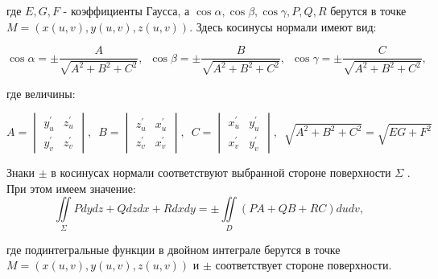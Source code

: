 где $E,G,F$ - коэффициенты Гаусса, а $\cos\alpha, \cos\beta, \cos\gamma , P,Q,R$ берутся в точке $M = (x(u, v), y(u, v), z(u, v))$. Здесь косинусы нормали имеют вид:

$$ \cos\alpha = \pm \frac{A}{\sqrt{A^2+B^2+C^2}}, \,\,\, \cos\beta = \pm \frac{B}{\sqrt{A^2+B^2+C^2}}, \,\,\, \cos\gamma = \pm \frac{C}{\sqrt{A^2+B^2+C^2}},$$

где величины:

$$A = \begin{vmatrix}
y_u^{'} & z_u^{'} \\
y_v^{'} & z_v^{'}
\end{vmatrix}, \,\,\, B = \begin{vmatrix}
z_u^{'} & x_u^{'} \\
z_v^{'} & x_v^{'}
\end{vmatrix}, \,\,\, C = \begin{vmatrix}
x_u^{'} & y_u^{'} \\
x_v^{'} & y_v^{'}
\end{vmatrix}, \,\,\, \sqrt{A^2+B^2+C^2} = \sqrt{EG+F^2}$$
 
Знаки $\pm$ в косинусах нормали соответствуют
выбранной стороне поверхности $\Sigma$ . При этом имеем значение:
$$\iint\limits_\Sigma Pdydz+Qdzdx+Rdxdy = \pm \iint\limits_D(PA+QB+RC)dudv,$$

где подинтегральные функции в двойном интеграле берутся в точке
$M = (x(u, v), y(u, v), z(u, v))$ и $\pm$ соответствует стороне поверхности.
